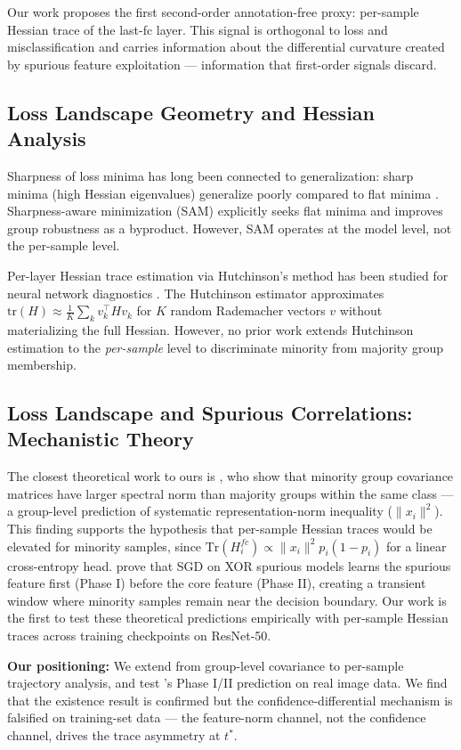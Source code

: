 Our work proposes the first second-order annotation-free proxy: per-sample Hessian trace of the last-fc layer. This signal is orthogonal to loss and misclassification and carries information about the differential curvature created by spurious feature exploitation --- information that first-order signals discard.

\subsection{Loss Landscape Geometry and Hessian Analysis}

Sharpness of loss minima has long been connected to generalization: sharp minima (high Hessian eigenvalues) generalize poorly compared to flat minima \cite{keskar2016large}. Sharpness-aware minimization (SAM) \cite{foret2021sharpnessaware} explicitly seeks flat minima and improves group robustness as a byproduct. However, SAM operates at the model level, not the per-sample level.

Per-layer Hessian trace estimation via Hutchinson's method has been studied for neural network diagnostics \cite{yao2020pyhessian}. The Hutchinson estimator approximates $\text{tr}(H) \approx \frac{1}{K}\sum_k v_k^\top H v_k$ for $K$ random Rademacher vectors $v$ without materializing the full Hessian. However, no prior work extends Hutchinson estimation to the \emph{per-sample} level to discriminate minority from majority group membership.

\subsection{Loss Landscape and Spurious Correlations: Mechanistic Theory}

The closest theoretical work to ours is \cite{labonte2024spectral}, who show that minority group covariance matrices have larger spectral norm than majority groups within the same class --- a group-level prediction of systematic representation-norm inequality ($\|x_i\|^2$). This finding supports the hypothesis that per-sample Hessian traces would be elevated for minority samples, since $\text{Tr}(H_i^{fc}) \propto \|x_i\|^2 p_i(1-p_i)$ for a linear cross-entropy head. \cite{labonte2026phase} prove that SGD on XOR spurious models learns the spurious feature first (Phase I) before the core feature (Phase II), creating a transient window where minority samples remain near the decision boundary. Our work is the first to test these theoretical predictions empirically with per-sample Hessian traces across training checkpoints on ResNet-50.

\textbf{Our positioning:} We extend \cite{labonte2024spectral} from group-level covariance to per-sample trajectory analysis, and test \cite{labonte2026phase}'s Phase I/II prediction on real image data. We find that the existence result is confirmed but the confidence-differential mechanism is falsified on training-set data --- the feature-norm channel, not the confidence channel, drives the trace asymmetry at $t^*$.
